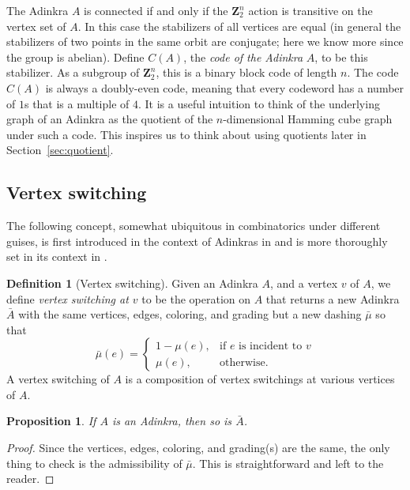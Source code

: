 \documentclass[12pt,twoside,singlespace]{article}
\numberwithin{equation}{section}
\newtheorem{prop}[equation]{Proposition}
\theoremstyle{definition}
\newtheorem{definition}[equation]{Definition}
\newcommand{\ZZ}{\mathbf{Z}}
\begin{document}
The Adinkra $A$ is connected if and only if the $\ZZ_2^n$ action is transitive on the vertex set of $A$.  In this case the stabilizers of all vertices are equal (in general the stabilizers of two points in the same orbit are conjugate; here we know more since the group is abelian).  Define $C(A)$, the \emph{code of the Adinkra} $A$, to be this stabilizer.  As a subgroup of $\ZZ_2^n$, this is a binary block code of length $n$.  The code $C(A)$ is always a doubly-even code\cite{d2l:omni,d2l:decodes}, meaning that every codeword has a number of $1$s that is a multiple of $4$. It is a useful intuition to think of the underlying graph of an Adinkra as the quotient of the $n$-dimensional Hamming cube graph under such a code\cite{d2l:omni,zhang:adinkras}. This inspires us to think about using quotients later in Section~\ref{sec:quotient}.


\subsection{Vertex switching}
\label{sec:vertexswitch}

The following concept, somewhat ubiquitous in combinatorics under different guises, is first introduced in the context of Adinkras in \cite{d2l:first} and is more thoroughly set in its context in \cite{dil:cohomology,zhang:adinkras}.

\begin{definition}[Vertex switching]
Given an Adinkra $A$, and a vertex $v$ of $A$, we define \emph{vertex switching at $v$} to be the operation on $A$ that returns a new Adinkra $\bar{A}$ with the same vertices, edges, coloring, and grading but a new dashing $\bar{\mu}$ so that
\begin{equation}
\bar{\mu}(e)=\begin{cases}
1-\mu(e),&\mbox{if $e$ is incident to $v$}\\
\mu(e),&\mbox{otherwise.}
\end{cases}
\end{equation}
A vertex switching of $A$ is a composition of vertex switchings at various vertices of $A$.
\end{definition}

\begin{prop}
\label{prop:switching-still-adinkra}
If $A$ is an Adinkra, then so is $\bar{A}$.
\end{prop}
\begin{proof}
Since the vertices, edges, coloring, and grading(s) are the same, the only thing to check is the admissibility of $\bar{\mu}$.  This is straightforward and left to the reader.
\end{proof}
\end{document}

